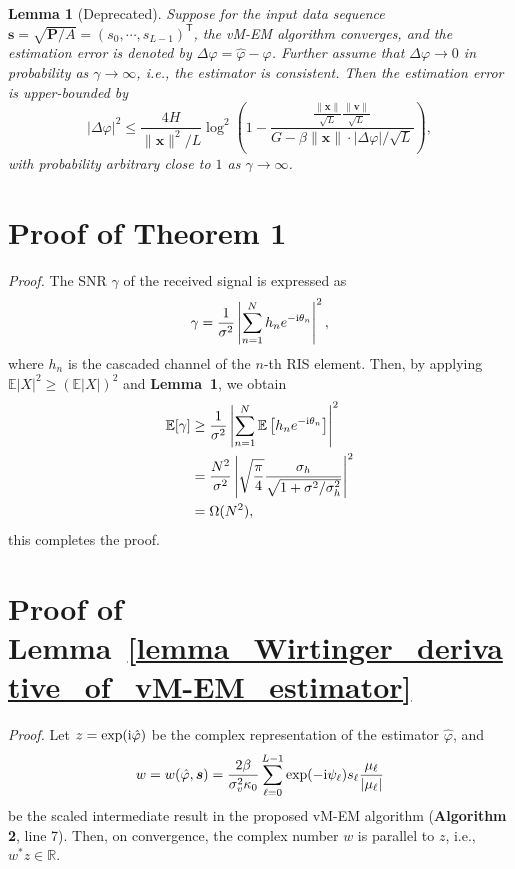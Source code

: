\documentclass[a4paper,12pt]{article}
\newtheorem{lemma}{\bf Lemma}
\def \T {^{\mathsf{T}}}
\def \ri {{\rm i}}
\begin{document}
\begin{lemma}[Deprecated]\label{lemma:perturbation_bound}
    Suppose for the input data sequence ${\bm s} = \sqrt{{\bm P}/A} = (s_0, \cdots, s_{L-1})\T$, the vM-EM algorithm converges, and the estimation error is denoted by $\Delta\varphi = \hat{\varphi} - \varphi$. Further assume that $\Delta\varphi\to 0$ in probability as $\gamma\to\infty$, i.e., the estimator is consistent. Then the estimation error is upper-bounded by
    \begin{equation}
        |\Delta\varphi|^2 \leq  \frac{4H}{\|{\bm x}\|^2/ L} \log^2 \left(1-\frac{\frac{\|{\bm x}\|}{\sqrt{L}}\frac{\|{\bm v}\|}{\sqrt{L}}}{G-\beta\|{\bm x}\| \cdot |\Delta\varphi|/\sqrt{L}}\right), \label{eqn:MSE-upper-bound}
    \end{equation} 
    with probability arbitrary close to $1$ as $\gamma\to\infty$. 
\end{lemma}



\appendix
\section{Proof of Theorem 1}
{\it {Proof.}} The SNR $\gamma$ of the received signal is expressed as 
\begin{equation}
    \gamma = \frac{1}{\sigma^2}\left| \sum_{n=1}^{N}h_n e^{-\ri \theta_n} \right|^2,
\end{equation}
where $h_n$ is the cascaded channel of the $n$-th RIS element. Then, by applying $\mathbb{E}|X|^2\geq (\mathbb{E}|X|)^2$ and {\bf Lemma~1}, we obtain 
\begin{equation}
    \begin{aligned}
    \mathbb{E}[\gamma] &\geq \frac{1}{\sigma^2}\left| \sum_{n=1}^{N}\mathbb{E}\left[h_n e^{-\ri \theta_n}\right] \right|^2 \\
    &= \frac{N^2}{\sigma^2} \left| \sqrt{\frac{\pi}{4}}\frac{\sigma_h}{\sqrt{1+\sigma^2/\sigma_h^2}} \right|^2 \\
    &= \Omega(N^2),
    \end{aligned}
\end{equation}
this completes the proof. 

\section{Proof of Lemma~\ref{lemma_Wirtinger_derivative_of_vM-EM_estimator}}
{\it {Proof.}}
Let $z=\exp(\ri \hat{\varphi})$ be the complex representation of the estimator $\hat\varphi$, and 
\begin{equation}
    w = w(\hat{\varphi}, {\bm s}) = \frac{2\beta}{\sigma_v^2 \kappa_0}\sum_{\ell=0}^{L-1}\exp(-\ri \psi_\ell) s_\ell \frac{\mu_\ell}{|\mu_\ell|} 
\end{equation}
be the scaled intermediate result in the proposed vM-EM algorithm ({\bf Algorithm 2}, line 7). Then, on convergence, the complex number $w$ is parallel to $z$, i.e., $w^*z\in\mathbb{R}$. 
\end{document}
